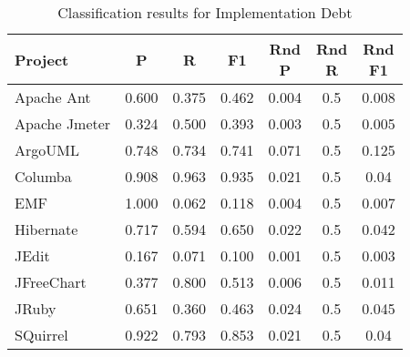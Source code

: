 \begin{table}[!hbt]
    \begin{center}
        \caption{Classification results for Implementation Debt}
        \label{tbl:classifier_results_implementation}
        \begin{tabular}{l| c c c c c c}
        \toprule
        \textbf{Project} & \textbf{P} & \textbf{R} & \textbf{F1} & \thead{Rnd\\P} & \thead{Rnd\\R} & \thead{Rnd\\F1} \\
        \midrule
        Apache Ant     &               0.600 &            0.375 &        0.462 &                     0.004 &                    0.5 &              0.008 \\
        Apache Jmeter  &               0.324 &            0.500 &        0.393 &                     0.003 &                    0.5 &              0.005 \\
        ArgoUML        &               0.748 &            0.734 &        0.741 &                     0.071 &                    0.5 &              0.125 \\
        Columba        &               0.908 &            0.963 &        0.935 &                     0.021 &                    0.5 &               0.04 \\
        EMF            &               1.000 &            0.062 &        0.118 &                     0.004 &                    0.5 &              0.007 \\
        Hibernate      &               0.717 &            0.594 &        0.650 &                     0.022 &                    0.5 &              0.042 \\
        JEdit          &               0.167 &            0.071 &        0.100 &                     0.001 &                    0.5 &              0.003 \\
        JFreeChart     &               0.377 &            0.800 &        0.513 &                     0.006 &                    0.5 &              0.011 \\
        JRuby          &               0.651 &            0.360 &        0.463 &                     0.024 &                    0.5 &              0.045 \\
        SQuirrel       &               0.922 &            0.793 &        0.853 &                     0.021 &                    0.5 &               0.04 \\
        \bottomrule
        \end{tabular}
    \end{center}    
\end{table}


